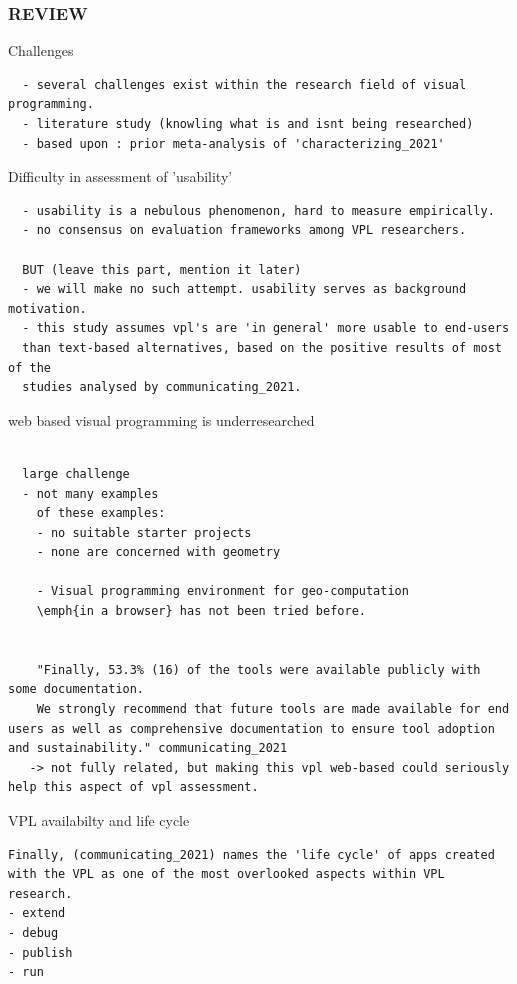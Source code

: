 \subsubsection*{REVIEW}
Challenges
\begin{lstlisting}
  - several challenges exist within the research field of visual programming. 
  - literature study (knowling what is and isnt being researched)
  - based upon : prior meta-analysis of 'characterizing_2021'
\end{lstlisting}

Difficulty in assessment of 'usability'
\begin{lstlisting}
  - usability is a nebulous phenomenon, hard to measure empirically.
  - no consensus on evaluation frameworks among VPL researchers. 

  BUT (leave this part, mention it later)
  - we will make no such attempt. usability serves as background motivation. 
  - this study assumes vpl's are 'in general' more usable to end-users 
  than text-based alternatives, based on the positive results of most of the 
  studies analysed by communicating_2021.   
\end{lstlisting}

web based visual programming is underresearched
\begin{lstlisting}
  
  large challenge
  - not many examples
    of these examples: 
    - no suitable starter projects
    - none are concerned with geometry

    - Visual programming environment for geo-computation 
    \emph{in a browser} has not been tried before. 


    "Finally, 53.3% (16) of the tools were available publicly with some documentation. 
    We strongly recommend that future tools are made available for end users as well as comprehensive documentation to ensure tool adoption and sustainability." communicating_2021 
   -> not fully related, but making this vpl web-based could seriously help this aspect of vpl assessment.   

\end{lstlisting}

VPL availabilty and life cycle
\begin{lstlisting}
Finally, (communicating_2021) names the 'life cycle' of apps created 
with the VPL as one of the most overlooked aspects within VPL research. 
- extend 
- debug
- publish
- run
\end{lstlisting}


